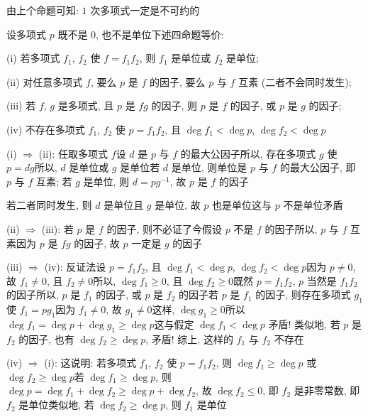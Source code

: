 \begin{example}
    由上个命题可知: $1$ 次多项式一定是不可约的\period
\end{example}

\begin{proposition}
    设多项式 $p$ 既不是 $0$, 也不是单位\period 下述四命题等价:

    (i) 若多项式 $f_1$, $f_2$ 使 $f = f_1 f_2$, 则 $f_1$ 是单位或 $f_2$ 是单位;

    (ii) 对任意多项式 $f$, 要么 $p$ 是 $f$ 的因子, 要么 $p$ 与 $f$ 互素 (二者不会同时发生);

    (iii) 若 $f$, $g$ 是多项式, 且 $p$ 是 $fg$ 的因子, 则 $p$ 是 $f$ 的因子, 或 $p$ 是 $g$ 的因子;

    (iv) 不存在多项式 $f_1$, $f_2$ 使 $p = f_1 f_2$, 且 $\deg f_1 < \deg p$, $\deg f_2 < \deg p$\period
\end{proposition}

\begin{pf}
    (i) $\Rightarrow$ (ii): 任取多项式 $f$\period 设 $d$ 是 $p$ 与 $f$ 的最大公因子\period 所以, 存在多项式 $g$ 使 $p = dg$\period 所以, $d$ 是单位或 $g$ 是单位\period 若 $d$ 是单位, 则单位是 $p$ 与 $f$ 的最大公因子, 即 $p$ 与 $f$ 互素; 若 $g$ 是单位, 则 $d = p g^{-1}$, 故 $p$ 是 $f$ 的因子\period

    若二者同时发生, 则 $d$ 是单位且 $g$ 是单位, 故 $p$ 也是单位\period 这与 $p$ 不是单位矛盾\period

    (ii) $\Rightarrow$ (iii): 若 $p$ 是 $f$ 的因子, 则不必证了\period 今假设 $p$ 不是 $f$ 的因子\period 所以, $p$ 与 $f$ 互素\period 因为 $p$ 是 $fg$ 的因子, 故 $p$ 一定是 $g$ 的因子\period

    (iii) $\Rightarrow$ (iv): 反证法\period 设 $p = f_1 f_2$, 且 $\deg f_1 < \deg p$, $\deg f_2 < \deg p$\period 因为 $p \neq 0$, 故 $f_1 \neq 0$, 且 $f_2 \neq 0$\period 所以, $\deg f_1 \geq 0$, 且 $\deg f_2 \geq 0$\period 既然 $p = f_1 f_2$, $p$ 当然是 $f_1 f_2$ 的因子\period 所以, $p$ 是 $f_1$ 的因子, 或 $p$ 是 $f_2$ 的因子\period 若 $p$ 是 $f_1$ 的因子, 则存在多项式 $g_1$ 使 $f_1 = pg_1$\period 因为 $f_1 \neq 0$, 故 $g_1 \neq 0$\period 这样, $\deg g_1 \geq 0$\period 所以 $\deg f_1 = \deg p + \deg g_1 \geq \deg p$\period 这与假定 $\deg f_1 < \deg p$ 矛盾! 类似地, 若 $p$ 是 $f_2$ 的因子, 也有 $\deg f_2 \geq \deg p$, 矛盾! 综上, 这样的 $f_1$ 与 $f_2$ 不存在\period

    (iv) $\Rightarrow$ (i): 这说明: 若多项式 $f_1$, $f_2$ 使 $p = f_1 f_2$, 则 $\deg f_1 \geq \deg p$ 或 $\deg f_2 \geq \deg p$\period 若 $\deg f_1 \geq \deg p$, 则 $\deg p = \deg f_1 + \deg f_2 \geq \deg p + \deg f_2$, 故 $\deg f_2 \leq 0$, 即 $f_2$ 是非零常数, 即 $f_2$ 是单位\period 类似地, 若 $\deg f_2 \geq \deg p$, 则 $f_1$ 是单位\period
\end{pf}

